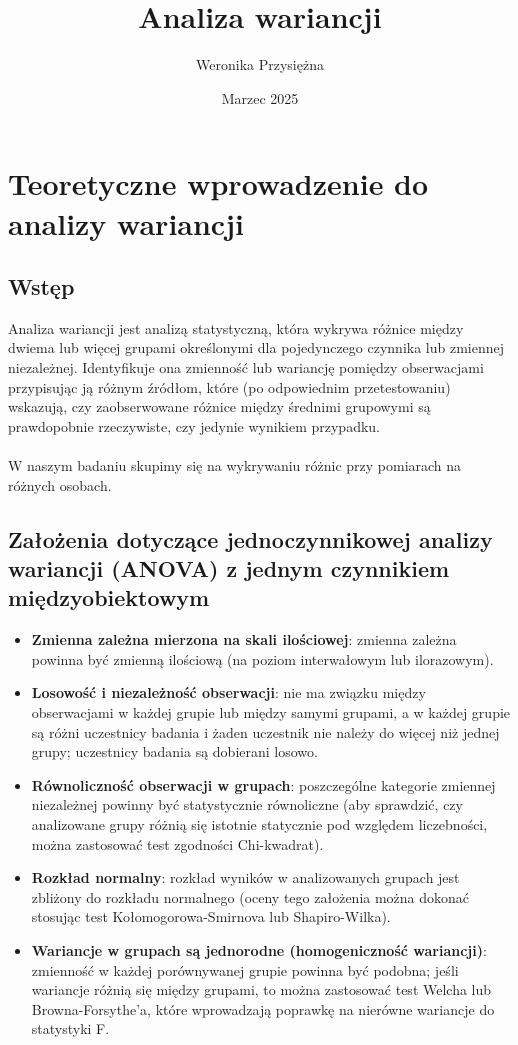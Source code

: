 \documentclass[12pt,a4paper]{article}
\title{Analiza wariancji}
\author{Weronika Przysiężna}
\date{Marzec 2025}
\begin{document}
\maketitle
\newpage
\section{Teoretyczne wprowadzenie do analizy wariancji}

\subsection{Wstęp}
Analiza wariancji jest analizą statystyczną, która wykrywa różnice między dwiema lub więcej grupami określonymi dla pojedynczego czynnika lub zmiennej niezależnej. Identyfikuje ona zmienność lub wariancję pomiędzy obserwacjami przypisując ją różnym źródłom, które (po odpowiednim przetestowaniu) wskazują, czy zaobserwowane różnice między średnimi grupowymi są prawdopobnie rzeczywiste, czy jedynie wynikiem przypadku. \cite{witte2010statistics}\\
\\W naszym badaniu skupimy się na wykrywaniu różnic przy pomiarach na różnych osobach.

\subsection{Założenia dotyczące jednoczynnikowej analizy wariancji (ANOVA) z jednym czynnikiem międzyobiektowym \cite{orourke2005sas}}

\begin{itemize}
    \item \textbf{Zmienna zależna mierzona na skali ilościowej}: zmienna zależna powinna być zmienną ilościową (na poziom interwałowym lub ilorazowym).
    \item \textbf{Losowość i niezależność obserwacji}: nie ma związku między obserwacjami w każdej grupie lub między samymi grupami, a w każdej grupie są różni uczestnicy badania i żaden uczestnik nie należy do więcej niż jednej grupy;  uczestnicy badania są dobierani losowo.
    \item \textbf{Równoliczność obserwacji w grupach}: poszczególne kategorie zmiennej niezależnej powinny być statystycznie równoliczne (aby sprawdzić, czy analizowane grupy różnią się istotnie statycznie pod względem liczebności, można zastosować test zgodności Chi-kwadrat).
    \item \textbf{Rozkład normalny}: rozkład wyników w analizowanych grupach jest zbliżony do rozkładu normalnego (oceny tego założenia można dokonać stosując test Kołomogorowa-Smirnova lub Shapiro-Wilka).
    \item \textbf{Wariancje w grupach są jednorodne (homogeniczność wariancji)}: zmienność w każdej porównywanej grupie powinna być podobna; jeśli wariancje różnią się między grupami, to można zastosować test Welcha lub Browna-Forsythe'a, które wprowadzają poprawkę na nierówne wariancje do statystyki F.

\end{itemize}
\end{document}
